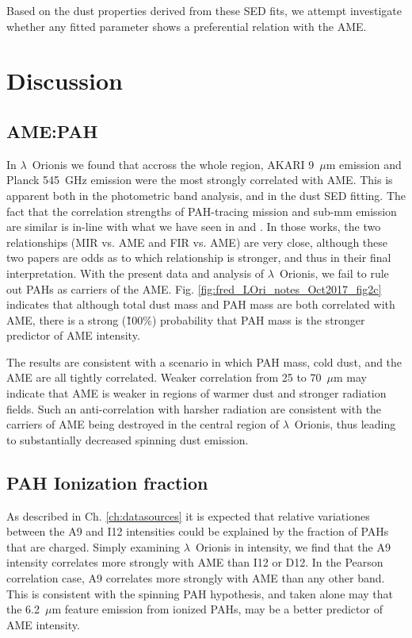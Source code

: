     Based on the dust properties derived from these SED fits, we attempt investigate whether any fitted parameter shows a preferential relation with the AME.

  \section{Discussion}
    \subsection{AME:PAH}

      In  $\lambda$~Orionis we found that accross the whole region, AKARI 9~$\mu$m emission and Planck 545~GHz emission were the most strongly correlated with AME. This is apparent both in the photometric band analysis, and in the dust SED fitting.  The fact that the correlation strengths of PAH-tracing mission and sub-mm emission are similar is in-line with what we have seen in \cite{ysard10b} and \cite{hensley16}. In those works, the two relationships (MIR vs. AME and FIR vs. AME) are very close, although these two papers are odds as to which relationship is stronger, and thus in their final interpretation. With the present data and analysis of $\lambda$~Orionis, we fail to rule out PAHs as carriers of the AME. Fig. \ref{fig:fred_LOri_notes_Oct2017_fig2c} indicates that although total dust mass and PAH mass are both correlated with AME, there is a strong (\~100\%) probability that PAH mass is the stronger predictor of AME intensity.

      The results are consistent with a scenario in which PAH mass, cold dust, and the AME are all tightly correlated. Weaker correlation from 25 to 70~$\mu$m may indicate that AME is weaker in regions of warmer dust and stronger radiation fields. Such an anti-correlation with harsher radiation are consistent with the carriers of AME being destroyed in the central region of $\lambda$~Orionis, thus leading to substantially decreased spinning dust emission.


      \subsection{PAH Ionization fraction}

      As described in Ch. \ref{ch:datasources} it is expected that relative variationes between the A9 and I12 intensities could be explained by the fraction of PAHs that are charged. Simply examining $\lambda$~Orionis in intensity, we find that the A9 intensity correlates more strongly with AME than I12 or D12. In the Pearson correlation case, A9 correlates more strongly with AME than any other band. This is consistent with the spinning PAH hypothesis, and taken alone may that the 6.2~$\mu$m feature emission from ionized PAHs, may be a better predictor of AME intensity.


